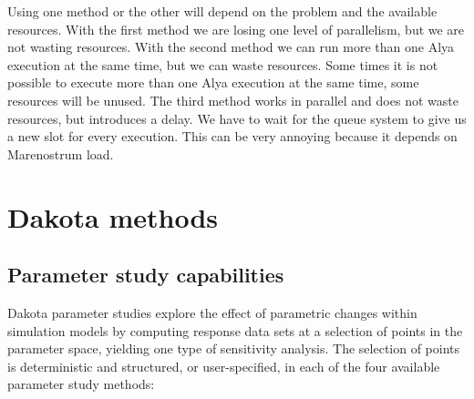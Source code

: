 \documentclass[12pt,a4paper,article]{memoir}
\begin{document}
Using one method or the other will depend on the problem and the available resources. With the first method we are losing one level of parallelism, but we are not wasting resources. With the second method we can run more than one Alya execution at the same time, but we can waste resources. Some times it is not possible to execute more than one Alya execution at the same time, some resources will be unused. The third method works in parallel and does not waste resources, but introduces a delay. We have to wait for the queue system to give us a new slot for every execution. This can be very annoying because it depends on Marenostrum load.

\chapter{Dakota methods}

\section{Parameter study capabilities}
Dakota parameter studies explore the effect of parametric changes within simulation models by computing response data sets at a selection of points in the parameter space, yielding one type of sensitivity analysis. The selection of points is deterministic and structured, or user-specified, in each of the four available parameter study methods:
\end{document}
